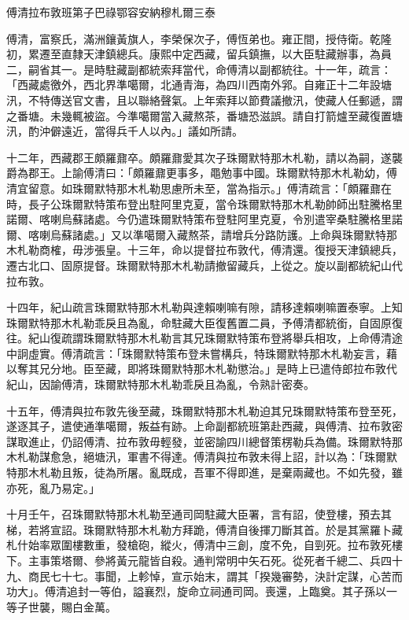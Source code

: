 
\begin{pinyinscope}
傅清拉布敦班第子巴祿鄂容安納穆札爾三泰

傅清，富察氏，滿洲鑲黃旗人，李榮保次子，傅恆弟也。雍正間，授侍衛。乾隆初，累遷至直隸天津鎮總兵。康熙中定西藏，留兵鎮撫，以大臣駐藏辦事，為員二，嗣省其一。是時駐藏副都統索拜當代，命傅清以副都統往。十一年，疏言：「西藏處徼外，西北界準噶爾，北通青海，為四川西南外郛。自雍正十二年設塘汛，不特傳送官文書，且以聯絡聲氣。上年索拜以節費議撤汛，使藏人任郵遞，謂之番塘。未幾輒被盜。今準噶爾當入藏熬茶，番塘恐滋誤。請自打箭爐至藏復置塘汛，酌沖僻遠近，當得兵千人以內。」議如所請。

十二年，西藏郡王頗羅鼐卒。頗羅鼐愛其次子珠爾默特那木札勒，請以為嗣，遂襲爵為郡王。上諭傅清曰：「頗羅鼐更事多，黽勉事中國。珠爾默特那木札勒幼，傅清宜留意。如珠爾默特那木札勒思慮所未至，當為指示。」傅清疏言：「頗羅鼐在時，長子公珠爾默特策布登出駐阿里克夏，當令珠爾默特那木札勒帥師出駐騰格里諾爾、喀喇烏蘇諸處。今仍遣珠爾默特策布登駐阿里克夏，令別遣宰桑駐騰格里諾爾、喀喇烏蘇諸處。」又以準噶爾入藏熬茶，請增兵分路防護。上命與珠爾默特那木札勒商榷，毋涉張皇。十三年，命以提督拉布敦代，傅清還。復授天津鎮總兵，遷古北口、固原提督。珠爾默特那木札勒請撤留藏兵，上從之。旋以副都統紀山代拉布敦。

十四年，紀山疏言珠爾默特那木札勒與達賴喇嘛有隙，請移達賴喇嘛置泰寧。上知珠爾默特那木札勒乖戾且為亂，命駐藏大臣復舊置二員，予傅清都統銜，自固原復往。紀山復疏謂珠爾默特那木札勒言其兄珠爾默特策布登將舉兵相攻，上命傅清途中詗虛實。傅清疏言：「珠爾默特策布登未嘗構兵，特珠爾默特那木札勒妄言，藉以奪其兄分地。臣至藏，即將珠爾默特那木札勒懲治。」是時上已遣侍郎拉布敦代紀山，因諭傅清，珠爾默特那木札勒乖戾且為亂，令熟計密奏。

十五年，傅清與拉布敦先後至藏，珠爾默特那木札勒迫其兄珠爾默特策布登至死，遂逐其子，遣使通準噶爾，叛益有跡。上命副都統班第赴西藏，與傅清、拉布敦密謀取進止，仍詔傅清、拉布敦毋輕發，並密諭四川總督策楞勒兵為備。珠爾默特那木札勒謀愈急，絕塘汛，軍書不得達。傅清與拉布敦未得上詔，計以為：「珠爾默特那木札勒且叛，徒為所屠。亂既成，吾軍不得即進，是棄兩藏也。不如先發，雖亦死，亂乃易定。」

十月壬午，召珠爾默特那木札勒至通司岡駐藏大臣署，言有詔，使登樓，預去其梯，若將宣詔。珠爾默特那木札勒方拜跪，傅清自後揮刀斷其首。於是其黨羅卜藏札什始率眾圍樓數重，發槍砲，縱火，傅清中三創，度不免，自剄死。拉布敦死樓下。主事策塔爾、參將黃元龍皆自殺。通判常明中矢石死。從死者千總二、兵四十九、商民七十七。事聞，上軫悼，宣示始末，謂其「揆幾審勢，決計定謀，心苦而功大」。傅清追封一等伯，謚襄烈，旋命立祠通司岡。喪還，上臨奠。其子孫以一等子世襲，賜白金萬。


\end{pinyinscope}
